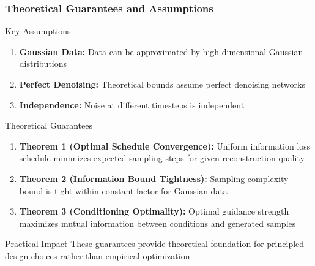 \documentclass[aspectratio=169]{beamer}
\begin{document}
\begin{frame}
\frametitle{Theoretical Guarantees and Assumptions}
\begin{block}{Key Assumptions}
\begin{enumerate}
\item \textbf{Gaussian Data:} Data can be approximated by high-dimensional Gaussian distributions
\item \textbf{Perfect Denoising:} Theoretical bounds assume perfect denoising networks
\item \textbf{Independence:} Noise at different timesteps is independent
\end{enumerate}
\end{block}

\begin{block}{Theoretical Guarantees}
\begin{enumerate}
\item \textbf{Theorem 1 (Optimal Schedule Convergence):} Uniform information loss schedule minimizes expected sampling steps for given reconstruction quality
\item \textbf{Theorem 2 (Information Bound Tightness):} Sampling complexity bound is tight within constant factor for Gaussian data
\item \textbf{Theorem 3 (Conditioning Optimality):} Optimal guidance strength maximizes mutual information between conditions and generated samples
\end{enumerate}
\end{block}

\begin{alertblock}{Practical Impact}
These guarantees provide theoretical foundation for principled design choices rather than empirical optimization
\end{alertblock}
\end{frame}
\end{document}
